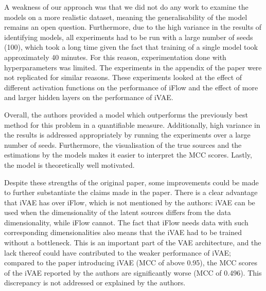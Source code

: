 A weakness of our approach was that we did not do any work to examine the models on a more realistic dataset, meaning the generalisability of the model remains an open question. Furthermore, due to the high variance in the results of identifying models, all experiments had to be run with a large number of seeds (100), which took a long time given the fact that training of a single model took approximately 40 minutes. For this reason, experimentation done with hyperparameters was limited. The experiments in the appendix of the paper were not replicated for similar reasons. These experiments looked at the effect of different activation functions on the performance of iFlow and the effect of more and larger hidden layers on the performance of iVAE.

Overall, the authors provided a model which outperforms the previously best method for this problem in a quantifiable measure. Additionally, high variance in the results is addressed appropriately by running the experiments over a large number of seeds. Furthermore, the visualisation of the true sources and the estimations by the models makes it easier to interpret the MCC scores. Lastly, the model is theoretically well motivated.

Despite these strengths of the original paper, some improvements could be made to further substantiate the claims made in the paper. 
There is a clear advantage that iVAE has over iFlow, which is not mentioned by the authors: iVAE can be used when the dimensionality of the latent sources differs from the data dimensionality, while iFlow cannot. The fact that iFlow needs data with such corresponding dimensionalities also means that the iVAE had to be trained without a bottleneck. This is an important part of the VAE architecture, and the lack thereof could have contributed to the weaker performance of iVAE; compared to the paper introducing iVAE (MCC of above 0.95), the MCC scores of the iVAE reported by the authors are significantly worse (MCC of 0.496). This discrepancy is not addressed or explained by the authors.

